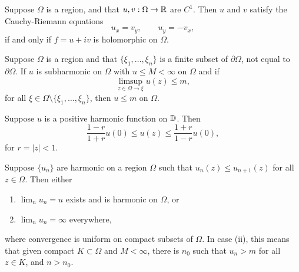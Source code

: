 \documentclass[12pt]{article}
\begin{document}
\begin{sats}
    Suppose $\Omega$ is a region, and that $u,v:\Omega\to\mathbb{R}$ are $C^1$. Then $u$ and $v$ satisfy the Cauchy-Riemann equations 
    \begin{equation*}
        u_x=v_y,\qquad u_y=-v_x,
    \end{equation*}
    if and only if $f=u+iv$ is holomorphic on $\Omega$.
\end{sats}

\begin{sats}
    Suppose $\Omega$ is a region and that $\{\xi_1,\dots,\xi_n\}$ is a finite subset of $\partial\Omega$, not equal to $\partial\Omega$. If $u$ is subharmonic on $\Omega$ with $u\leq M<\infty$ on $\Omega$ and if 
    \begin{equation*}
        \limsup_{z\in\Omega\to\xi} u(z) \leq m,
    \end{equation*}
    for all $\xi\in\Omega\setminus\{\xi_1,\dots,\xi_n\}$, then $u\leq m$ on $\Omega$.
\end{sats}

\begin{sats}
    Suppose $u$ is a positive harmonic function on $\mathbb{D}$. Then
    \begin{equation*}
        \frac{1-r}{1+r}u(0)\leq u(z)\leq \frac{1+r}{1-r}u(0),
    \end{equation*}   
    for $r=|z|<1$.
\end{sats}

\begin{sats}
    Suppose $\{u_n\}$ are harmonic on a region $\Omega$ such that $u_n(z)\leq u_{n+1}(z)$ for all $z\in\Omega$. Then either
    \begin{enumerate}[label=(\roman*)]
        \item $\lim_n u_n = u$ exists and is harmonic on $\Omega$, or
        \item $\lim_n u_n = \infty$ everywhere,
    \end{enumerate}
    where convergence is uniform on compact subsets of $\Omega$. In case (ii), this means that given compact $K\subset \Omega$ and $M<\infty$, there is $n_0$ such that $u_n>m$ for all $z\in K$, and $n>n_0$.
\end{sats}
\end{document}
